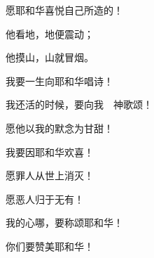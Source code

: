 {\par }{\Q 愿耶和华喜悦自己所造的！
\par }{\Q {}他看地，地便震动；
\par }{\Q 他摸山，山就冒烟。
\par }{\Q {}我要一生向耶和华唱诗！
\par }{\Q 我还活的时候，要向我　神歌颂！
\par }{\Q {}愿他以我的默念为甘甜！
\par }{\Q 我要因耶和华欢喜！
\par }{\Q {}愿罪人从世上消灭！
\par }{\Q 愿恶人归于无有！
\par }{\BB \par }{\Q 我的心哪，要称颂耶和华！
\par }{\Q 你们要赞美耶和华！

}
